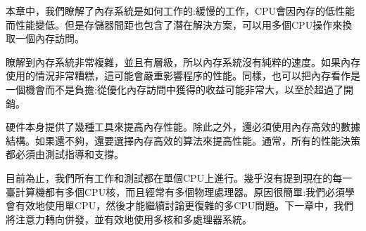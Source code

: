 本章中，我們瞭解了內存系統是如何工作的:緩慢的工作，CPU會因內存的低性能而性能變低。但是存儲器間距也包含了潛在解決方案，可以用多個CPU操作來換取一個內存訪問。

瞭解到內存系統非常複雜，並且有層級，所以內存系統沒有純粹的速度。如果內存使用的情況非常糟糕，這可能會嚴重影響程序的性能。同樣，也可以把內存看作是一個機會而不是負擔:從優化內存訪問中獲得的收益可能非常大，以至於超過了開銷。

硬件本身提供了幾種工具來提高內存性能。除此之外，還必須使用內存高效的數據結構。如果還不夠，還要選擇內存高效的算法來提高性能。通常，所有的性能決策都必須由測試指導和支撐。

目前為止，我們所有工作和測試都在單個CPU上進行。幾乎沒有提到現在的每一臺計算機都有多個CPU核，而且經常有多個物理處理器。原因很簡單:我們必須學會有效地使用單CPU，然後才能繼續討論更復雜的多CPU問題。下一章中，我們將注意力轉向併發，並有效地使用多核和多處理器系統。